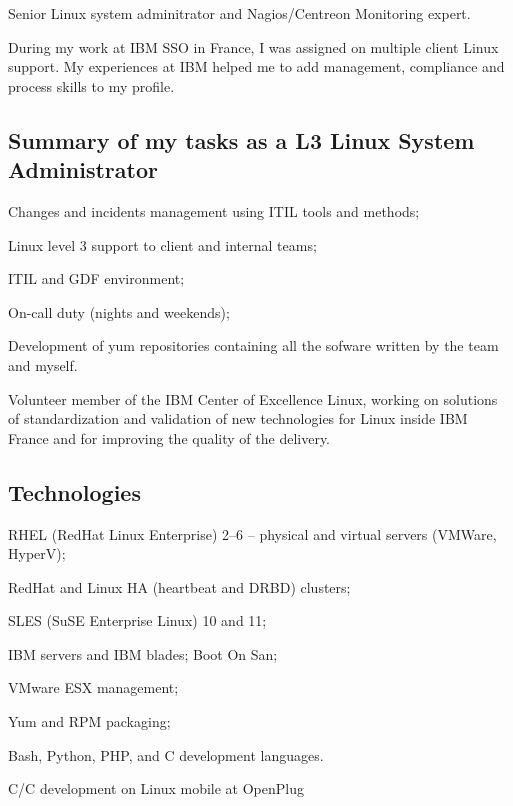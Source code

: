 \noindent
Senior Linux system adminitrator and Nagios/Centreon Monitoring expert.

During my work at IBM SSO in France, I was assigned on multiple client Linux support.
My experiences at IBM helped me to add management, compliance and process skills 
to my profile. 

\subsection{Summary of my tasks as a L3 Linux System Administrator}

\item{\bdot} Changes and incidents management using ITIL tools and methods;
\item{\bdot} Linux level 3 support to client and internal teams;
\item{\bdot} ITIL and GDF environment;
\item{\bdot} On-call duty (nights and weekends);
\item{\bdot} Development of yum repositories containing all the sofware 
   written by the team and myself.

\smallskip\noindent
Volunteer member of the IBM Center of Excellence Linux, working on solutions of 
standardization and validation of new technologies for Linux inside IBM France and
for improving the quality of the delivery.

\subsection{Technologies}

\item{\bdot} RHEL (RedHat Linux Enterprise) 2--6 -- physical and virtual 
   servers (VMWare, HyperV);
\item{\bdot} RedHat and Linux HA (heartbeat and DRBD) clusters;
\item{\bdot} SLES (SuSE Enterprise Linux) 10 and 11;
\item{\bdot} IBM servers and IBM blades; Boot On San;
\item{\bdot} VMware ESX management;
\item{\bdot} Yum and RPM packaging;
\item{\bdot} Bash, Python, PHP, and C development languages.


\bigskip
{}
   {C/C\plusplus{} development on Linux mobile at OpenPlug}

